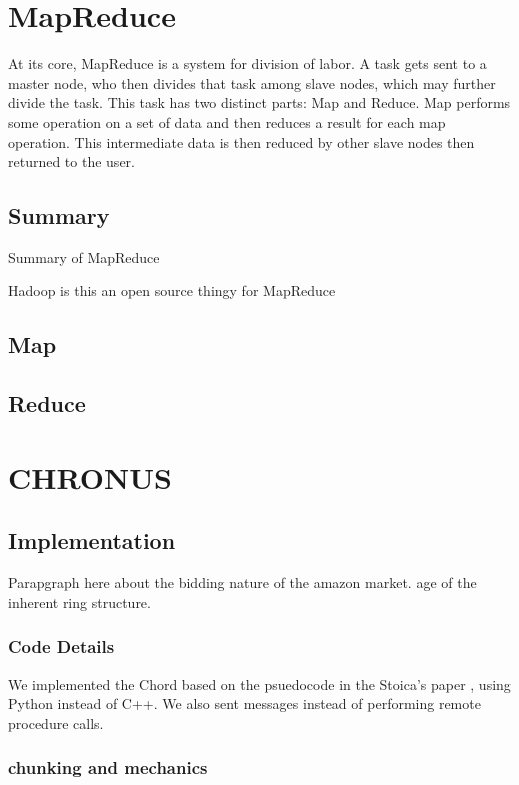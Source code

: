 \documentclass[conference, compsocconf, letterpaper]{IEEEtran}
\begin{document}
\section{MapReduce}
At its core, MapReduce \cite{mapreduce} is a system for division of labor.  A task gets sent to a master node, who then divides that task among slave nodes, which may further divide the task.  This task has two distinct parts: Map and Reduce.  Map performs some operation on a set of data and then reduces a result for each map operation.  This intermediate data is then reduced by other slave nodes then returned to the user. 

\subsection{Summary}

Summary of MapReduce \cite{mapreduce} 

Hadoop is this an open source thingy for MapReduce \cite{hadoop}

\subsection{Map}
\subsection{Reduce}


\section{CHRONUS}




\subsection{Implementation}
Parapgraph here about the bidding nature of the amazon market.
age of the inherent ring structure.





\subsubsection{Code Details}
We implemented the Chord based on the psuedocode  in the Stoica's paper \cite{Chord}, using Python instead of C++.  We also sent messages instead of performing remote procedure calls.


\subsubsection{chunking and mechanics }
\end{document}
